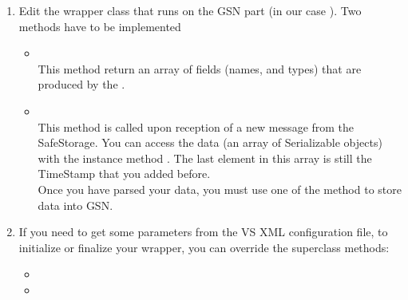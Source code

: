 \begin{enumerate}
	\item Edit the wrapper class that runs on the GSN part (in our case ).
	Two methods have to be implemented

	\begin{itemize}
		\item {} \\
		This method return an array of fields (names, and types) that are produced by the \wrapper.

		\item {} \\
		This method is called upon reception of a new message from the SafeStorage.
		You can access the data (an array of Serializable objects) with the instance method .
		The last element in this array is still the TimeStamp that you added before.\\ %
		Once you have parsed your data, you must use one of the  method to store data into GSN.
%
%	
	\end{itemize}

	\item If you need to get some parameters from the VS XML configuration file, to initialize or finalize your wrapper, you can override 
	the superclass methods:

	\begin{itemize}
		\item {}
		\item {}
	\end{itemize}
\end{enumerate}

